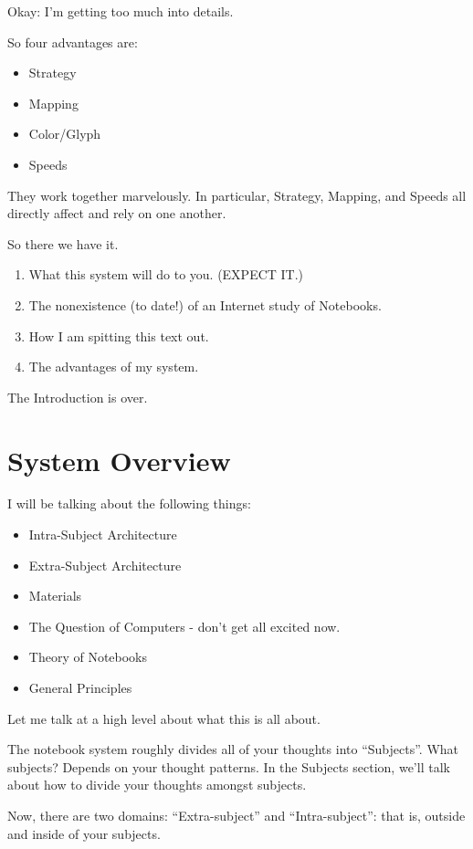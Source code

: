 \documentclass[oneside]{book}
\begin{document}
Okay: I'm getting too much into details.

So four advantages are:
\begin{itemize}
\item Strategy
\item Mapping
\item Color/Glyph
\item Speeds
\end{itemize}

They work together marvelously. In particular, Strategy, Mapping, and
Speeds all directly affect and rely on one another.

So there we have it.

\begin{enumerate}
\item What this system will do to you. (EXPECT IT.)
\item The nonexistence (to date!) of an Internet study of Notebooks.
\item How I am spitting this text out.
\item The advantages of my system.
\end{enumerate}

The Introduction is over.

\chapter{System Overview}
I will be talking about the following things:

\begin{itemize}
\item Intra-Subject Architecture
\item Extra-Subject Architecture
\item Materials
\item The Question of Computers - don't get all excited now.
\item Theory of Notebooks
\item General Principles
\end{itemize}

Let me talk at a high level about what this is all about.


The notebook system roughly divides all of your thoughts into
``Subjects''. What subjects? Depends on your thought patterns. In the
Subjects section, we'll talk about how to divide your thoughts amongst
subjects.

Now, there are two domains: ``Extra-subject'' and ``Intra-subject'': that
is, outside and inside of your subjects.
\end{document}
